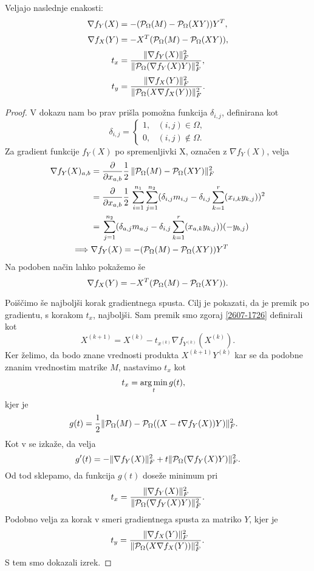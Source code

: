 \begin{theorem}
Veljajo naslednje enakosti:
\begin{align*}
    \nabla f_Y(X) &= -(\mathcal{P}_\Omega(M) - \mathcal{P}_\Omega(XY))Y^T,\\[0.2em]
    \nabla f_X(Y) &= -X^T (\mathcal{P}_\Omega(M) - \mathcal{P}_\Omega(XY)),\\[0.2em]
    t_x &= \frac{\lVert\nabla f_Y(X)\rVert_F^2}{\lVert\mathcal{P}_\Omega(\nabla f_Y(X)Y)\rVert_F^2},  \\[0.2em]
    t_y &= \frac{\lVert\nabla f_X(Y)\rVert_F^2}{\lVert\mathcal{P}_\Omega(X \nabla f_X(Y))\rVert_F^2}. 
\end{align*}
\end{theorem}

\begin{proof}
V dokazu nam bo prav prišla pomožna funkcija $\delta_{i, j}$, definirana kot
\[
    \delta_{i,j} = 
    \left\{
    \begin{array}{rl}
        1,& (i, j) \in \Omega, \\
        0,& (i, j) \notin \Omega.
    \end{array}
    \right.
\]
Za gradient funkcije $f_Y(X)$ po spremenljivki X, označen z $\nabla f_Y(X)$, velja
\begin{align*}
    \nabla f_Y(X)_{a,b} &= \frac{\partial}{\partial x_{a,b}} \frac{1}{2}\, \lVert\mathcal{P}_\Omega(M) - \mathcal{P}_\Omega(XY)\rVert_F^2  \\
    &= \frac{\partial}{\partial x_{a,b}} \frac{1}{2}\, \sum_{i=1}^{n_1}\sum_{j=1}^{n_2}(\delta_{i,j}m_{i,j} - \delta_{i,j}\sum_{k=1}^{r}(x_{i,k}y_{k,j}))^2  \\
    &= \, \sum_{j=1}^{n_2}(\delta_{a,j}m_{a,j} - \delta_{i,j}\sum_{k=1}^{r}(x_{a,k}y_{k,j}))(-y_{b,j}) \\
    \implies &\nabla f_Y(X) = -(\mathcal{P}_\Omega(M) - \mathcal{P}_\Omega(XY))Y^T
\end{align*}
Na podoben način lahko pokažemo še
\[
    \nabla f_X(Y) = -X^T (\mathcal{P}_\Omega(M) - \mathcal{P}_\Omega(XY)).
\]

Poiščimo še najboljši korak gradientnega spusta.
Cilj je pokazati, da je premik po gradientu, s korakom $t_x$, najboljši.
Sam premik smo zgoraj \eqref{2607-1726} definirali kot
\[
    X^{(k+1)} = X^{(k)} - t_{x^{(k)}} \nabla f_{Y^{(k)}}(X^{(k)}).
\]
Ker želimo, da bodo znane vrednosti produkta $X^{(k+1)}Y^{(k)}$ kar se da podobne znanim vrednostim matrike $M$, nastavimo $t_x$ kot 
\begin{align*}
    t_x &= \operatorname*{arg\,min}_t g(t),
\end{align*} kjer je
\begin{align*}
    g(t) &= \frac{1}{2} \lVert\mathcal{P}_\Omega(M) - \mathcal{P}_\Omega((X - t\nabla f_Y(X))Y)\rVert_F^2.
\end{align*}
Kot v \cite{AST-TK15} se izkaže, da velja
\[
  g'(t) = -\lVert\nabla f_Y(X)\rVert_F^2 + t\lVert\mathcal{P}_\Omega(\nabla f_Y(X)Y)\rVert_F^2. 
\]
Od tod sklepamo, da funkcija $g(t)$ doseže minimum pri 
\[
  t_x = \frac{\lVert\nabla f_Y(X)\rVert_F^2}{\lVert\mathcal{P}_\Omega(\nabla f_Y(X)Y)\rVert_F^2}.  
\]
Podobno velja za korak v smeri gradientnega spusta za matriko $Y$, kjer je
\[
  t_y = \frac{\lVert\nabla f_X(Y)\rVert_F^2}{\lVert\mathcal{P}_\Omega(X \nabla f_X(Y))\rVert_F^2}.  
\]
S tem smo dokazali izrek.
\end{proof}